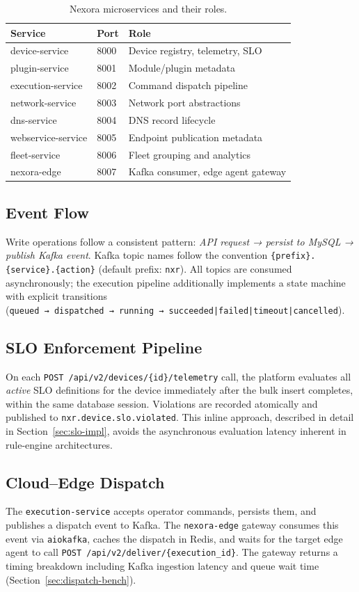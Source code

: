 \documentclass[twocolumn,smallextended]{svjour3}
\begin{document}
\begin{table}[t]
\centering
\caption{Nexora microservices and their roles.}
\label{tab:services}
\begin{tabular}{@{}lll@{}}
\toprule
Service & Port & Role \\
\midrule
device-service      & 8000 & Device registry, telemetry, SLO \\
plugin-service      & 8001 & Module/plugin metadata \\
execution-service   & 8002 & Command dispatch pipeline \\
network-service     & 8003 & Network port abstractions \\
dns-service         & 8004 & DNS record lifecycle \\
webservice-service  & 8005 & Endpoint publication metadata \\
fleet-service       & 8006 & Fleet grouping and analytics \\
nexora-edge         & 8007 & Kafka consumer, edge agent gateway \\
\bottomrule
\end{tabular}
\end{table}

\subsection{Event Flow}
Write operations follow a consistent pattern:
\emph{API request → persist to MySQL → publish Kafka event}.
Kafka topic names follow the convention
\texttt{\{prefix\}.\{service\}.\{action\}} (default prefix: \texttt{nxr}).
All topics are consumed asynchronously; the execution pipeline additionally
implements a state machine with explicit transitions
(\texttt{queued~→~dispatched~→~running~→~succeeded|failed|timeout|cancelled}).

\subsection{SLO Enforcement Pipeline}
On each \texttt{POST /api/v2/devices/\{id\}/telemetry} call, the platform
evaluates all \emph{active} SLO definitions for the device immediately after
the bulk insert completes, within the same database session. Violations are
recorded atomically and published to \texttt{nxr.device.slo.violated}. This
inline approach, described in detail in Section~\ref{sec:slo-impl}, avoids the
asynchronous evaluation latency inherent in rule-engine architectures.

\subsection{Cloud--Edge Dispatch}
The \texttt{execution-service} accepts operator commands, persists them, and
publishes a dispatch event to Kafka. The \texttt{nexora-edge} gateway consumes
this event via \texttt{aiokafka}, caches the dispatch in Redis, and waits for
the target edge agent to call \texttt{POST /api/v2/deliver/\{execution\_id\}}.
The gateway returns a timing breakdown including Kafka ingestion latency and
queue wait time (Section~\ref{sec:dispatch-bench}).
\end{document}
